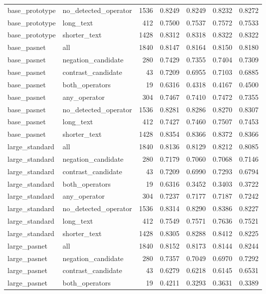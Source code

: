 \begin{tabular}{llrrrrr}
base\_prototype & no\_detected\_operator & 1536 & 0.8249 & 0.8249 & 0.8232 & 0.8272 \\
base\_prototype & long\_text & 412 & 0.7500 & 0.7537 & 0.7572 & 0.7533 \\
base\_prototype & shorter\_text & 1428 & 0.8312 & 0.8318 & 0.8322 & 0.8322 \\
base\_pasnet & all & 1840 & 0.8147 & 0.8164 & 0.8150 & 0.8180 \\
base\_pasnet & negation\_candidate & 280 & 0.7429 & 0.7355 & 0.7404 & 0.7309 \\
base\_pasnet & contrast\_candidate & 43 & 0.7209 & 0.6955 & 0.7103 & 0.6885 \\
base\_pasnet & both\_operators & 19 & 0.6316 & 0.4318 & 0.4167 & 0.4500 \\
base\_pasnet & any\_operator & 304 & 0.7467 & 0.7410 & 0.7472 & 0.7355 \\
base\_pasnet & no\_detected\_operator & 1536 & 0.8281 & 0.8286 & 0.8270 & 0.8307 \\
base\_pasnet & long\_text & 412 & 0.7427 & 0.7460 & 0.7507 & 0.7453 \\
base\_pasnet & shorter\_text & 1428 & 0.8354 & 0.8366 & 0.8372 & 0.8366 \\
large\_standard & all & 1840 & 0.8136 & 0.8129 & 0.8212 & 0.8085 \\
large\_standard & negation\_candidate & 280 & 0.7179 & 0.7060 & 0.7068 & 0.7146 \\
large\_standard & contrast\_candidate & 43 & 0.7209 & 0.6990 & 0.7293 & 0.6794 \\
large\_standard & both\_operators & 19 & 0.6316 & 0.3452 & 0.3403 & 0.3722 \\
large\_standard & any\_operator & 304 & 0.7237 & 0.7177 & 0.7187 & 0.7242 \\
large\_standard & no\_detected\_operator & 1536 & 0.8314 & 0.8290 & 0.8386 & 0.8227 \\
large\_standard & long\_text & 412 & 0.7549 & 0.7571 & 0.7636 & 0.7521 \\
large\_standard & shorter\_text & 1428 & 0.8305 & 0.8288 & 0.8412 & 0.8225 \\
large\_pasnet & all & 1840 & 0.8152 & 0.8173 & 0.8144 & 0.8244 \\
large\_pasnet & negation\_candidate & 280 & 0.7357 & 0.7049 & 0.6970 & 0.7292 \\
large\_pasnet & contrast\_candidate & 43 & 0.6279 & 0.6218 & 0.6145 & 0.6531 \\
large\_pasnet & both\_operators & 19 & 0.4211 & 0.3293 & 0.3631 & 0.3389 \\

\end{tabular}
